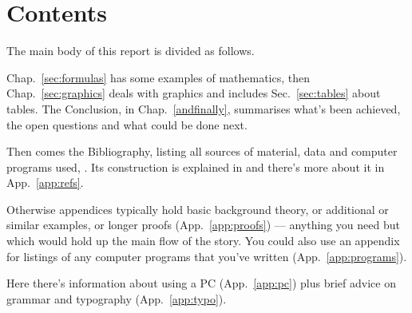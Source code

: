 \section{Contents}\label{intro:contents}
The main body of this report is divided as follows.
\par
Chap.~\ref{sec:formulas} has some examples of mathematics, then
Chap.~\ref{sec:graphics} deals with graphics and includes
Sec.~\ref{sec:tables} about tables. The Conclusion, in
Chap.~\ref{andfinally}, summarises what's been achieved, the open
questions and what could be done next.
\par
Then comes the Bibliography, listing all sources of material, data and
computer programs used, \etc. Its construction is explained in
\cite[Sec.~4.2]{NSS} and there's more about it in App.~\ref{app:refs}.
\par
Otherwise appendices typically hold basic background theory, or
additional or similar examples, or longer proofs (App.~\ref{app:proofs})
 --- anything you need but which would hold up the main flow of the
story. You could also use an appendix for listings of any computer
programs that you've written (App.~\ref{app:programs}).
\par
Here there's information about using a PC (App.~\ref{app:pc}) plus
brief advice on grammar and typography (App.~\ref{app:typo}).
%
